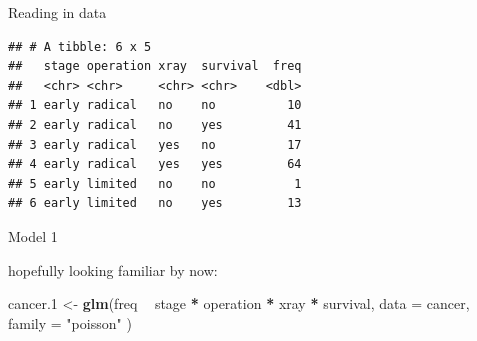 \documentclass[
  ignorenonframetext,
]{beamer}
\newenvironment{Shaded}{\begin{snugshade}}{\end{snugshade}}
\newcommand{\DataTypeTok}[1]{\textcolor[rgb]{0.13,0.29,0.53}{#1}}
\newcommand{\DecValTok}[1]{\textcolor[rgb]{0.00,0.00,0.81}{#1}}
\newcommand{\FloatTok}[1]{\textcolor[rgb]{0.00,0.00,0.81}{#1}}
\newcommand{\KeywordTok}[1]{\textcolor[rgb]{0.13,0.29,0.53}{\textbf{#1}}}
\newcommand{\NormalTok}[1]{#1}
\newcommand{\OperatorTok}[1]{\textcolor[rgb]{0.81,0.36,0.00}{\textbf{#1}}}
\newcommand{\StringTok}[1]{\textcolor[rgb]{0.31,0.60,0.02}{#1}}
\begin{document}
\begin{frame}[fragile]{Reading in data}
\protect\hypertarget{reading-in-data}{}

\small

\begin{Shaded}
\end{Shaded}

\begin{verbatim}
## # A tibble: 6 x 5
##   stage operation xray  survival  freq
##   <chr> <chr>     <chr> <chr>    <dbl>
## 1 early radical   no    no          10
## 2 early radical   no    yes         41
## 3 early radical   yes   no          17
## 4 early radical   yes   yes         64
## 5 early limited   no    no           1
## 6 early limited   no    yes         13
\end{verbatim}

\normalsize

\end{frame}

\begin{frame}[fragile]{Model 1}
\protect\hypertarget{model-1}{}

hopefully looking familiar by now:

\begin{Shaded}
\begin{Highlighting}[]
\NormalTok{cancer}\FloatTok{.1}\NormalTok{ <-}\StringTok{ }\KeywordTok{glm}\NormalTok{(freq }\OperatorTok{~}\StringTok{ }\NormalTok{stage }\OperatorTok{*}\StringTok{ }\NormalTok{operation }\OperatorTok{*}\StringTok{ }\NormalTok{xray }\OperatorTok{*}\StringTok{ }\NormalTok{survival,}
  \DataTypeTok{data =}\NormalTok{ cancer, }\DataTypeTok{family =} \StringTok{"poisson"}
\NormalTok{)}
\end{Highlighting}
\end{Shaded}

\end{frame}
\end{document}
